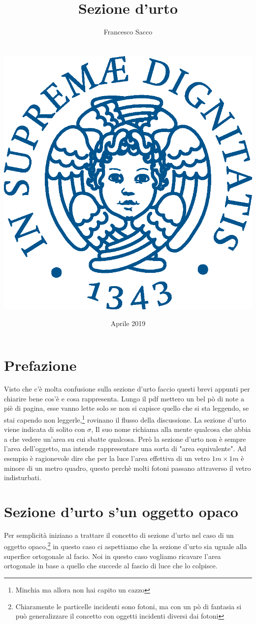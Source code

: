 \documentclass[11pt,a4paper]{article}
\date{{\LARGE Aprile 2019}}
\title{{\myfont Sezione d'urto}}
\author{{\Huge Francesco Sacco}\\ \\ \\
		\includegraphics[scale=0.6]{Immagini/cherubino.eps}\\}
\begin{document}
	\maketitle
	\tableofcontents
	\newpage
	\section*{Prefazione}
		Visto che c'è molta confusione sulla sezione d'urto faccio questi brevi appunti per chiarire bene cos'è e cosa rappresenta.\newline
		Lungo il pdf mettero un bel pò di note a piè di pagina, esse vanno lette solo se non si capisce quello che si sta leggendo, se stai capendo non leggerle,\footnote{Minchia ma allora non hai capito un cazzo} rovinano il flusso della discussione.\newline 
		La sezione d'urto viene indicata di solito con $\sigma$, Il suo nome richiama alla mente qualcosa che abbia a che vedere un'area su cui sbatte qualcosa. Però la sezione d'urto non è sempre l'area dell'oggetto, ma intende rappresentare una sorta di "area equivalente".\newline
		Ad esempio è ragionevole dire che per la luce l'area effettiva di un vetro $1m\times 1m$ è minore di un metro quadro, questo perchè molti fotoni passano attraverso il vetro indisturbati.\newline
	\section{Sezione d'urto s'un oggetto opaco}
	\label{sec:opaco}
		Per semplicità iniziano a trattare il concetto di sezione d'urto nel caso di un oggetto opaco,\footnote{Chiaramente le particelle incidenti sono fotoni, ma con un pò di fantasia si può generalizzare il concetto con oggetti incidenti diversi dai fotoni} in questo caso ci aspettiamo che la sezione d'urto sia uguale alla superfice ortogonale al facio.\newline
		Noi in questo caso vogliamo ricavare l'area ortogonale in base a quello che succede al fascio di luce che lo colpisce.\newline
\end{document}

